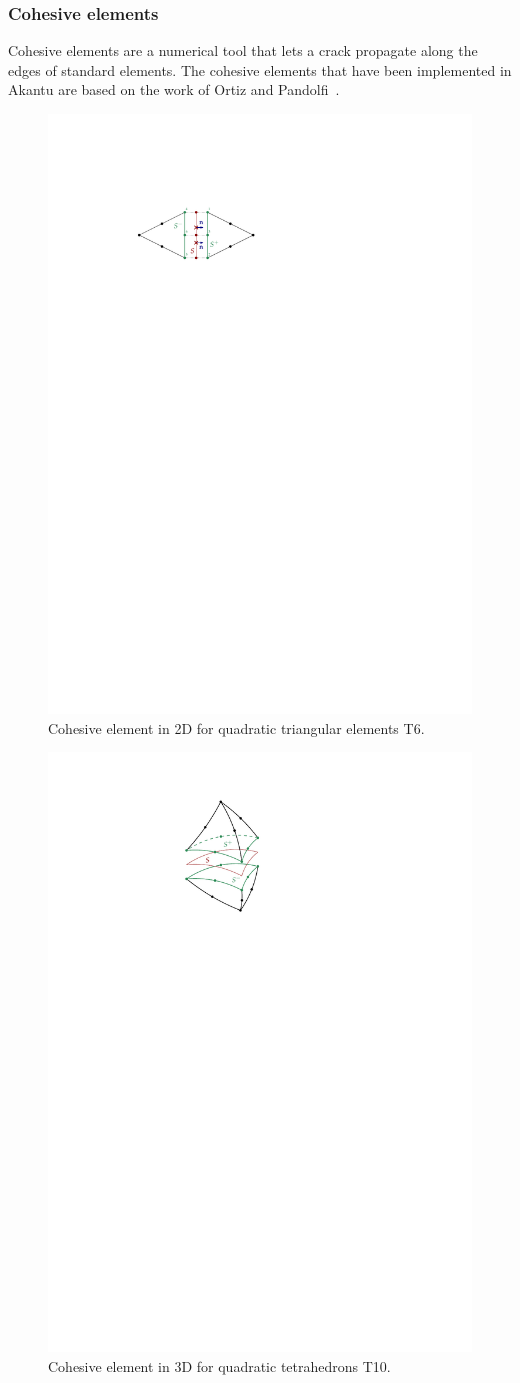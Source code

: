 \subsubsection{Cohesive elements}

Cohesive elements are a numerical tool that lets a crack propagate
along the edges of standard elements. The cohesive elements that have
been implemented in Akantu are based on the work of Ortiz and
Pandolfi~\cite{ortiz1999}.

\begin{figure}
  \centering
  \includegraphics[width=.55\textwidth]{figures/cohesive2d}
  \caption{Cohesive element in 2D for quadratic triangular elements
    T6.}
  \label{fig:smm:coh:cohesive2d}
\end{figure}

\begin{figure}
  \centering
  \includegraphics[width=.25\textwidth]{figures/cohesive3d}
  \caption{Cohesive element in 3D for quadratic tetrahedrons T10.}
  \label{fig:smm:coh:cohesive3d}
\end{figure}

